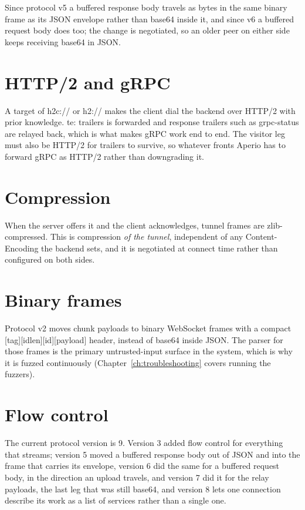 \documentclass[11pt,a4paper,oneside]{book}
\newcommand{\aperiobreakableunderscore}{\textunderscore\allowbreak}
\newcommand{\aperiocodebreaks}{\XeTeXinterchartokenstate=1 }
\newcommand{\aperiocodebreaks}{}
\DeclareRobustCommand{\code}[1]{{\ttfamily\small\aperiocodebreaks
  \let\_\aperiobreakableunderscore#1}}
\begin{document}
Since protocol v5 a buffered response body travels as bytes in the same
binary frame as its JSON envelope rather than base64 inside it, and
since v6 a buffered request body does too; the change is negotiated, so
an older peer on either side keeps receiving base64 in JSON.

\section{HTTP/2 and gRPC}

A target of \code{h2c://} or \code{h2://} makes the client dial the
backend over HTTP/2 with prior knowledge. \code{te: trailers} is
forwarded and response trailers such as \code{grpc-status} are relayed
back, which is what makes gRPC work end to end. The visitor leg must also
be HTTP/2 for trailers to survive, so whatever fronts Aperio has to
forward gRPC as HTTP/2 rather than downgrading it.

\section{Compression}

When the server offers it and the client acknowledges, tunnel frames are
zlib-compressed. This is compression \emph{of the tunnel}, independent of
any \code{Content-Encoding} the backend sets, and it is negotiated at
connect time rather than configured on both sides.

\section{Binary frames}

Protocol v2 moves chunk payloads to binary WebSocket frames with a compact
\code{[tag][id\_len][id][payload]} header, instead of base64 inside JSON.
The parser for those frames is the primary untrusted-input surface in the
system, which is why it is fuzzed continuously
(Chapter~\ref{ch:troubleshooting} covers running the fuzzers).

\section{Flow control}
\label{sec:flow-control}

The current protocol version is 9. Version 3 added flow control for
everything that streams; version 5 moved a buffered response body out of
JSON and into the frame that carries its envelope, version 6 did the same
for a buffered request body, in the direction an upload travels, and
version 7 did it for the relay payloads, the last leg that was still
base64, and version 8 lets one connection describe its work as a list of
services rather than a single one.
\end{document}

